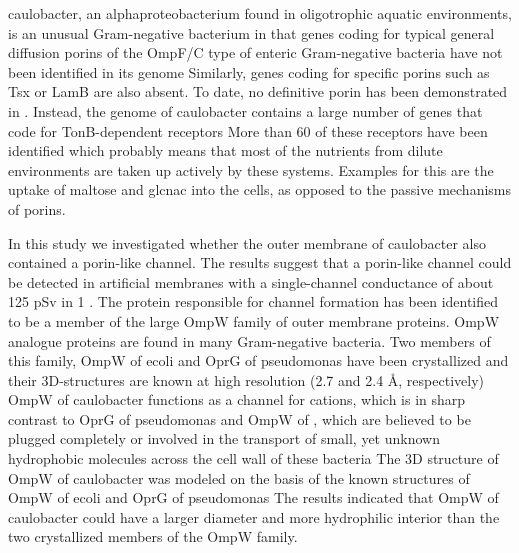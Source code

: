     \acl{caulobacter}, an alphaproteobacterium found in oligotrophic aquatic environments, is an unusual Gram-negative bacterium in that genes coding for typical general diffusion porins of the OmpF/C type of enteric Gram-negative bacteria have not been identified in its genome Similarly, genes coding for specific porins such as Tsx or LamB are also absent. To date, no definitive porin has been demonstrated in \caulobacter. Instead, the genome of \ac{caulobacter} contains a large number of genes that code for TonB-dependent receptors More than 60 of these receptors have been identified which probably means that most of the nutrients from dilute environments are taken up actively by these systems. Examples for this are the uptake of maltose and \ac{glcnac} into the cells, as opposed to the passive mechanisms of porins.

    In this study we investigated whether the outer membrane of \ac{caulobacter} also contained a porin-like channel. The results suggest that  a porin-like channel could be detected in artificial membranes with a single-channel conductance of about 125 \si{\pico\sievert} in 1 \si{\molar} . The protein responsible for channel formation has been identified to be a member of the large OmpW family of outer membrane proteins. OmpW analogue proteins are found in many Gram-negative bacteria. Two members of this family, OmpW of \ac{ecoli} and OprG of \acl{pseudomonas} have been crystallized and their 3D-structures are known at high resolution (2.7 and 2.4 \AA, respectively)  OmpW of \ac{caulobacter} functions as a channel for cations, which is in sharp contrast to OprG of \ac{pseudomonas} and OmpW of \ecoli, which are believed to be plugged completely or involved in the transport of small, yet unknown hydrophobic molecules across the cell wall of these bacteria The 3D structure of OmpW of \ac{caulobacter} was modeled on the basis of the known structures of OmpW of \ac{ecoli} and OprG of \ac{pseudomonas} The results indicated that OmpW of \ac{caulobacter} could have a larger diameter and more hydrophilic interior than the two crystallized members of the OmpW family.

